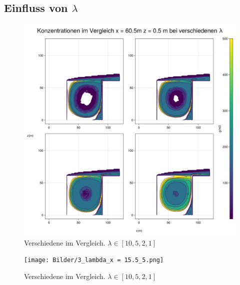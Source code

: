 \documentclass[ngerman]{scrartcl}
\begin{document}
\subsection{Einfluss von $\lambda$ }
\begin{figure}[H]
	\centering
	\includegraphics[scale=0.3]{Bilder/3_lambda_x = 60.5.png}
	\caption{Verschiedene \lambda im Vergleich. $\lambda \in[10,5 ,2,1]$}
	\label{fig:my_label}
\end{figure}
\begin{figure}[H]
	\centering
\texttt{[image: Bilder/3\_lambda\_x = 15.5\_5.png]}
\caption{Verschiedene \lambda im Vergleich. $\lambda \in[10,5 ,2,1]$}
\label{fig:my_label}
\end{figure}
\end{document}
